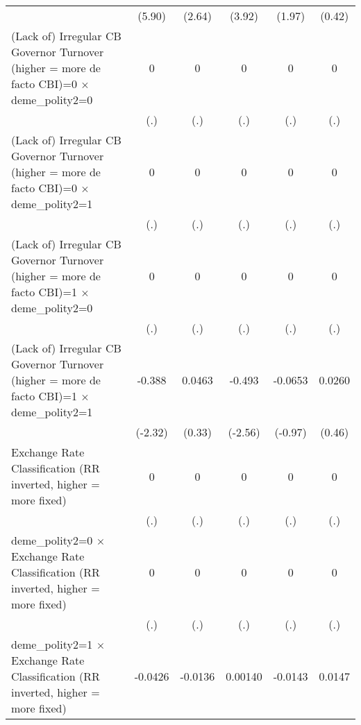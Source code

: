 {\begin{tabular}{l*{5}{c}}
                &   (5.90)         &   (2.64)         &   (3.92)         &   (1.97)         &   (0.42)         \\
[1em]
(Lack of) Irregular CB Governor Turnover (higher = more de facto CBI)=0 $\times$ deme\_polity2=0&        0         &        0         &        0         &        0         &        0         \\
                &      (.)         &      (.)         &      (.)         &      (.)         &      (.)         \\
[1em]
(Lack of) Irregular CB Governor Turnover (higher = more de facto CBI)=0 $\times$ deme\_polity2=1&        0         &        0         &        0         &        0         &        0         \\
                &      (.)         &      (.)         &      (.)         &      (.)         &      (.)         \\
[1em]
(Lack of) Irregular CB Governor Turnover (higher = more de facto CBI)=1 $\times$ deme\_polity2=0&        0         &        0         &        0         &        0         &        0         \\
                &      (.)         &      (.)         &      (.)         &      (.)         &      (.)         \\
[1em]
(Lack of) Irregular CB Governor Turnover (higher = more de facto CBI)=1 $\times$ deme\_polity2=1&   -0.388\sym{*}  &   0.0463         &   -0.493\sym{*}  &  -0.0653         &   0.0260         \\
                &  (-2.32)         &   (0.33)         &  (-2.56)         &  (-0.97)         &   (0.46)         \\
[1em]
Exchange Rate Classification (RR inverted, higher = more fixed)&        0         &        0         &        0         &        0         &        0         \\
                &      (.)         &      (.)         &      (.)         &      (.)         &      (.)         \\
[1em]
deme\_polity2=0 $\times$ Exchange Rate Classification (RR inverted, higher = more fixed)&        0         &        0         &        0         &        0         &        0         \\
                &      (.)         &      (.)         &      (.)         &      (.)         &      (.)         \\
[1em]
deme\_polity2=1 $\times$ Exchange Rate Classification (RR inverted, higher = more fixed)&  -0.0426\sym{**} &  -0.0136         &  0.00140         &  -0.0143         &   0.0147         \\

\end{tabular}}
